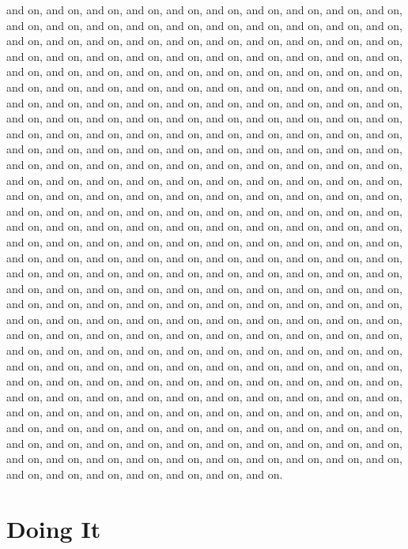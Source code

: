 \documentclass[12pt]{dalthesis}
\begin{document}
and on, and on, and on, and on, and on, and on, and on, and on, and on,
and on, and on, and on, and on, and on, and on, and on, and on, and on,
and on, and on, and on, and on, and on, and on, and on, and on, and on,
and on, and on, and on, and on, and on, and on, and on, and on, and on,
and on, and on, and on, and on, and on, and on, and on, and on, and on,
and on, and on, and on, and on, and on, and on, and on, and on, and on,
and on, and on, and on, and on, and on, and on, and on, and on, and on,
and on, and on, and on, and on, and on, and on, and on, and on, and on,
and on, and on, and on, and on, and on, and on, and on, and on, and on,
and on, and on, and on, and on, and on, and on, and on, and on, and on,
and on, and on, and on, and on, and on, and on, and on, and on, and on,
and on, and on, and on, and on, and on, and on, and on, and on, and on,
and on, and on, and on, and on, and on, and on, and on, and on, and on,
and on, and on, and on, and on, and on, and on, and on, and on, and on,
and on, and on, and on, and on, and on, and on, and on, and on, and on,
and on, and on, and on, and on, and on, and on, and on, and on, and on,
and on, and on, and on, and on, and on, and on, and on, and on, and on,
and on, and on, and on, and on, and on, and on, and on, and on, and on,
and on, and on, and on, and on, and on, and on, and on, and on, and on,
and on, and on, and on, and on, and on, and on, and on, and on, and on,
and on, and on, and on, and on, and on, and on, and on, and on, and on,
and on, and on, and on, and on, and on, and on, and on, and on, and on,
and on, and on, and on, and on, and on, and on, and on, and on, and on,
and on, and on, and on, and on, and on, and on, and on, and on, and on,
and on, and on, and on, and on, and on, and on, and on, and on, and on,
and on, and on, and on, and on, and on, and on, and on, and on, and on,
and on, and on, and on, and on, and on, and on, and on, and on, and on,
and on, and on, and on, and on, and on, and on, and on, and on, and on,
and on, and on, and on, and on, and on, and on, and on, and on, and on,
and on, and on, and on, and on, and on, and on, and on, and on, and on,
and on, and on, and on, and on, and on, and on, and on, and on, and on,
and on, and on, and on, and on, and on, and on, and on, and on, and on,
and on, and on, and on, and on, and on, and on, and on, and on, and on,
and on, and on, and on, and on, and on, and on, and on, and on, and on,
and on.


\chapter{Doing It}
\end{document}

